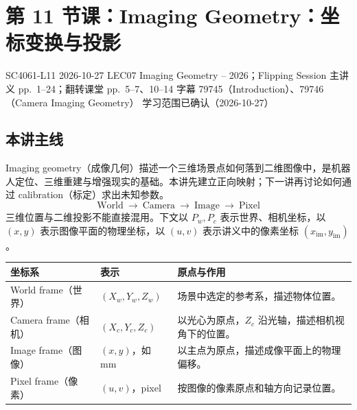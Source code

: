
\section{第 11 节课：Imaging Geometry：坐标变换与投影}
\label{lecture:SC4061-L11}

\lecturemeta
  {SC4061-L11}
  {2026-10-27}
  {LEC07 Imaging Geometry -- 2026；Flipping Session}
  {主讲义 pp.~1--24；翻转课堂 pp.~5--7、10--14}
  {字幕 79745（Introduction）、79746（Camera Imaging Geometry）}
  {学习范围已确认（2026-10-27）}

\subsection{本讲主线}

Imaging geometry（成像几何）描述一个三维场景点如何落到二维图像中，是机器人定位、三维重建与增强现实的基础。本讲先建立正向映射；下一讲再讨论如何通过 calibration（标定）求出未知参数。
\[
  \boxed{\text{World}\ \longrightarrow\ \text{Camera}\
    \longrightarrow\ \text{Image}\ \longrightarrow\ \text{Pixel}}
\]
三维位置与二维投影不能直接混用。下文以 $P_w,P_c$ 表示世界、相机坐标，以 $(x,y)$ 表示图像平面的物理坐标，以 $(u,v)$ 表示讲义中的像素坐标 $(x_{\mathrm{im}},y_{\mathrm{im}})$。


\begin{center}
\small
\begin{tabularx}{\textwidth}{@{}>{\raggedright\arraybackslash}p{3.6cm}>{\raggedright\arraybackslash}p{3.1cm}X@{}}
  \toprule
  坐标系 & 表示 & 原点与作用 \\
  \midrule
  World frame（世界） & $(X_w,Y_w,Z_w)$ & 场景中选定的参考系，描述物体位置。\\
  Camera frame（相机） & $(X_c,Y_c,Z_c)$ & 以光心为原点，$Z_c$ 沿光轴，描述相机视角下的位置。\\
  Image frame（图像） & $(x,y)$，如 mm & 以主点为原点，描述成像平面上的物理偏移。\\
  Pixel frame（像素） & $(u,v)$，pixel & 按图像的像素原点和轴方向记录位置。\\
  \bottomrule
\end{tabularx}
\end{center}

